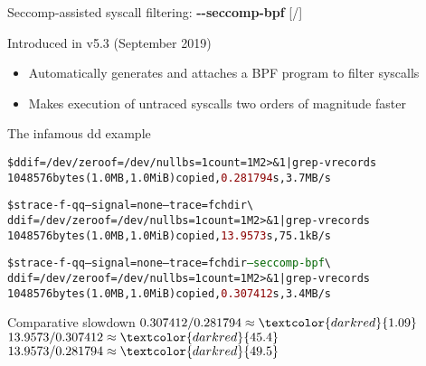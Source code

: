 \documentclass[unicode,aspectratio=169,xcolor={table,dvipsnames,usernames}]{beamer}
\begin{document}
\begin{frame}[fragile]{Seccomp-assisted syscall filtering: \textbf{-{}-seccomp-bpf} \hfill [\insertframenumber/\inserttotalframenumber]}
\begin{block}{Introduced in v5.3 (September 2019)}
\small
\begin{itemize}
\item Automatically generates and attaches a BPF program to filter syscalls
\item Makes execution of untraced syscalls two orders of magnitude faster
\end{itemize}
\end{block}

\begin{block}{The infamous dd example}
\scriptsize
\begin{alltt}
\$ dd if=/dev/zero of=/dev/null bs=1 count=1M 2>\&1 | grep -v records
1048576 bytes (1.0 MB, 1.0 MiB) copied, \textcolor{darkred}{0.281794} s, 3.7 MB/s

\$ strace -f -qq --signal=none --trace=fchdir \textbackslash
  dd if=/dev/zero of=/dev/null bs=1 count=1M 2>\&1 | grep -v records
1048576 bytes (1.0 MB, 1.0 MiB) copied, \textcolor{darkred}{13.9573} s, 75.1 kB/s

\$ strace -f -qq --signal=none --trace=fchdir \textcolor{darkgreen}{--seccomp-bpf} \textbackslash
  dd if=/dev/zero of=/dev/null bs=1 count=1M 2>\&1 | grep -v records
1048576 bytes (1.0 MB, 1.0 MiB) copied, \textcolor{darkred}{0.307412} s, 3.4 MB/s
\end{alltt}
\end{block}

\begin{block}{Comparative slowdown}
$0.307412 / 0.281794 \approx \textcolor{darkred}{1.09}$ \hfill
$13.9573 / 0.307412 \approx \textcolor{darkred}{45.4}$ \hfill
$13.9573 / 0.281794 \approx \textcolor{darkred}{49.5}$
\end{block}
\end{frame}
\end{document}
